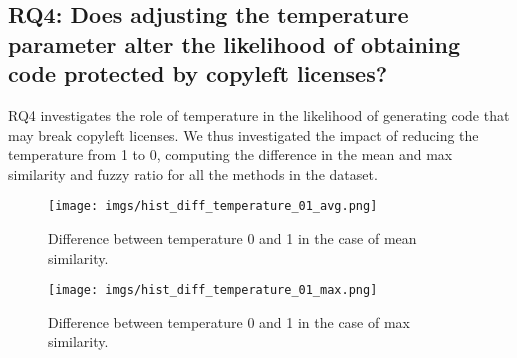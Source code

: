 \noindent {}


\subsection{RQ4: Does adjusting the temperature parameter alter the likelihood of obtaining code protected by copyleft licenses?}

RQ4 investigates the role of temperature in the likelihood of generating code that may break copyleft licenses. We thus investigated the impact of reducing the temperature from 1 to 0, computing the difference in the mean and max similarity and fuzzy ratio for all the methods in the dataset.

\begin{figure}
    \centering
    \texttt{[image: imgs/hist\_diff\_temperature\_01\_avg.png]}
    \vspace{-10pt} 
    
    \caption{Difference between temperature 0 and 1 in the case of mean similarity.}
    \label{fig:hist_diff_temperature_01_avg}
\end{figure}

\begin{figure}
    \centering
    \texttt{[image: imgs/hist\_diff\_temperature\_01\_max.png]}
    \vspace{-10pt} 
    
    \caption{Difference between temperature 0 and 1 in the case of max similarity.}
    \label{fig:hist_diff_temperature_01_max}
\end{figure}


